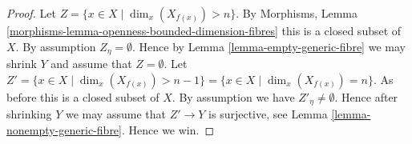 \documentclass[10pt,a4paper]{amsart}
\theoremstyle{plain}
\theoremstyle{definition}
\theoremstyle{remark}
\numberwithin{equation}{subsection}
\begin{document}
\begin{proof}
Let $Z = \{x \in X \mid \dim_x(X_{f(x)}) > n \}$. By
Morphisms, Lemma \ref{morphisms-lemma-openness-bounded-dimension-fibres}
this is a closed subset of $X$. By assumption $Z_\eta = \emptyset$.
Hence by
Lemma \ref{lemma-empty-generic-fibre}
we may shrink $Y$ and assume that $Z = \emptyset$. Let
$Z' = \{x \in X \mid \dim_x(X_{f(x)}) > n - 1 \} =
\{x \in X \mid \dim_x(X_{f(x)}) = n\}$. As before this is a closed subset
of $X$. By assumption we have $Z'_\eta \not = \emptyset$. Hence after
shrinking $Y$ we may assume that $Z' \to Y$ is surjective, see
Lemma \ref{lemma-nonempty-generic-fibre}.
Hence we win.
\end{proof}
\end{document}
